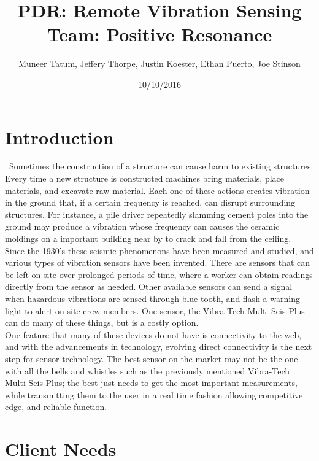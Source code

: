 \documentclass[12pt]{article}
\begin{document}
\title{PDR: Remote Vibration Sensing\\ Team: Positive Resonance}

\author{Muneer Tatum, Jeffery Thorpe, Justin Koester, Ethan Puerto, Joe Stinson}

\date{10/10/2016}
\maketitle
\tableofcontents
\newpage
\section{Introduction}

\quad \ Sometimes the construction of a structure can cause harm to existing structures. Every time a new structure is constructed machines bring materials, place materials, and excavate raw material. Each one of these actions creates vibration in the ground that, if a certain frequency is reached, can disrupt surrounding structures. For instance, a pile driver repeatedly slamming cement poles into the ground may produce a vibration whose frequency can causes the ceramic moldings on a important building near by to crack and fall from the ceiling.\\

Since the 1930's these seismic phenomenons have been measured and studied, and various types of vibration sensors have been invented. There are sensors that can be left on site over prolonged periods of time, where a worker can obtain readings directly from the sensor as needed.  Other available sensors can send a signal when hazardous vibrations are sensed through blue tooth, and flash a warning light to alert on-site crew members.  One sensor, the Vibra-Tech Multi-Seis Plus can do many of these things, but is a costly option.  \\

One feature that many of these devices do not have is connectivity to the web, and with the advancements in technology, evolving direct connectivity is the next step for sensor technology. The best sensor on the market may not be the one with all the bells and whistles such as the previously mentioned Vibra-Tech Multi-Seis Plus; the best just needs to get the most important measurements, while transmitting them to the user in a real time fashion allowing competitive edge, and reliable function.            
\newpage

\section{Client Needs}
\end{document}
